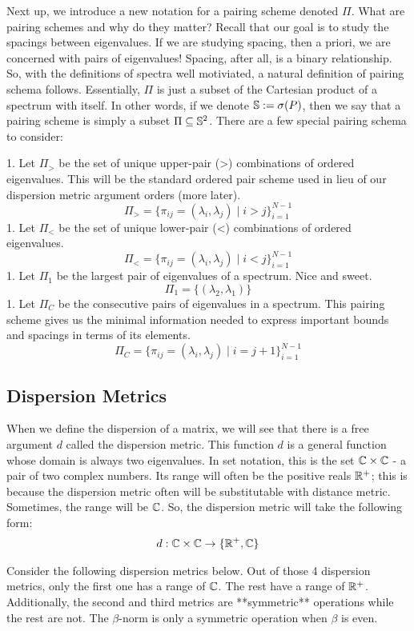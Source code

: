 Next up, we introduce a new notation for a pairing scheme denoted $\Pi$. What are pairing schemes and why do they matter? Recall that our goal is to study the spacings between eigenvalues. If we are studying spacing, then a priori, we are concerned with pairs of eigenvalues! Spacing, after all, is a binary relationship. So, with the definitions of spectra well motiviated, a natural definition of pairing schema follows. Essentially, $\Pi$ is just a subset of the Cartesian product of a spectrum with itself. In other words, if we denote $\S := \sigma(P)$, then we say that a pairing scheme is simply a subset $\Pi \subseteq \S^2$. There are a few special pairing schema to consider:

1. Let $\Pi_>$ be the set of unique upper-pair (>) combinations of ordered eigenvalues. This will be the standard ordered pair scheme used in lieu of our dispersion metric argument orders (more later).
$$\Pi_> = \{\pi_{ij} = (\lambda_i,\lambda_j) \mid i > j\}_{i = 1}^{N-1}$$
1. Let $\Pi_<$ be the set of unique lower-pair (<) combinations of ordered eigenvalues.
$$\Pi_< = \{\pi_{ij} = (\lambda_i,\lambda_j) \mid i < j\}_{i = 1}^{N-1}$$
1. Let $\Pi_1$ be the largest pair of eigenvalues of a spectrum. Nice and sweet.
$$\Pi_1 = \{(\lambda_2,\lambda_1)\}$$
1. Let $\Pi_C$ be the consecutive pairs of eigenvalues in a spectrum. This pairing scheme gives us the minimal information needed to express important bounds and spacings in terms of its elements.
$$\Pi_C = \{\pi_{ij} = (\lambda_i,\lambda_j) \mid i = j + 1\}_{i = 1}^{N-1}$$

\subsection{Dispersion Metrics}

When we define the dispersion of a matrix, we will see that there is a free argument $d$ called the dispersion metric. This function $d$ is a general function whose domain is always two eigenvalues. In set notation, this is the set $\Cc \times \Cc$ - a pair of two complex numbers. Its range will often be the positive reals $\R^+$; this is because the dispersion metric often will be substitutable with distance metric. Sometimes, the range will be $\Cc$. So, the dispersion metric will take the following form:
\begin{align*}
d: \Cc \times \Cc \to \{\R^+, \Cc\}
\end{align*}

Consider the following dispersion metrics below. Out of those 4 dispersion metrics, only the first one has a range of $\Cc$. The rest have a range of $\R^+$. Additionally, the second and third metrics are **symmetric** operations while the rest are not. The $\beta$-norm is only a symmetric operation when $\beta$ is even.

